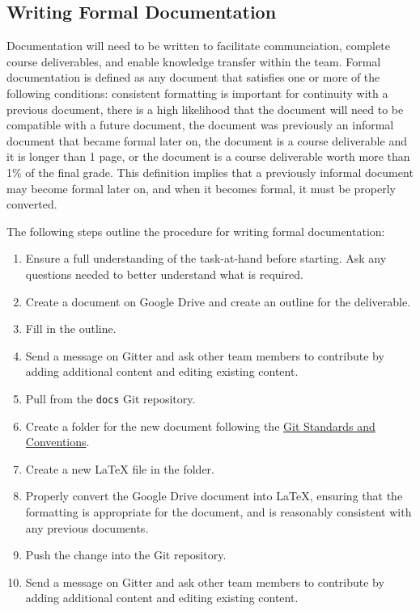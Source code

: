 \documentclass{article}
\begin{document}
\subsection{Writing Formal Documentation}
\label{sec:formal-documentation}
Documentation will need to be written to facilitate communciation, complete course deliverables, and enable knowledge transfer within the team. Formal documentation is defined as any document that satisfies one or more of the following conditions: consistent formatting is important for continuity with a previous document, there is a high likelihood that the document will need to be compatible with a future document, the document was previously an informal document that became formal later on, the document is a course deliverable and it is longer than 1 page, or the document is a course deliverable worth more than 1\% of the final grade. This definition implies that a previously informal document may become formal later on, and when it becomes formal, it must be properly converted.

The following steps outline the procedure for writing formal documentation:

\begin{enumerate}
\item Ensure a full understanding of the task-at-hand before starting. Ask any questions needed to better understand what is required.
\item Create a document on Google Drive and create an outline for the deliverable.
\item Fill in the outline.
\item Send a message on Gitter and ask other team members to contribute by adding additional content and editing existing content.
\item Pull from the \texttt{docs} Git repository.
\item Create a folder for the new document following the \hyperref[sec:git-conventions]{Git Standards and Conventions}.
\item Create a new LaTeX file in the folder.
\item Properly convert the Google Drive document into LaTeX, ensuring that the formatting is appropriate for the document, and is reasonably consistent with any previous documents.
\item Push the change into the Git repository.
\item Send a message on Gitter and ask other team members to contribute by adding additional content and editing existing content.
\end{enumerate}
\end{document}
